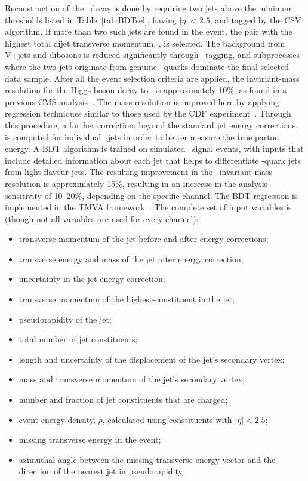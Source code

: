 \documentclass[12pt,twoside,a4paper,cmspaper,final,collab]{cms-tdr}
\begin{document}
Reconstruction of the \HBB\ decay is done by requiring two
jets above the minimum \pt thresholds listed in Table~\ref{tab:BDTsel}, having $|\eta|<2.5$, and tagged by the
CSV algorithm.
If more than two such jets are
found in the event, the pair with the
highest total dijet transverse momentum, \ptjj, is selected. The background from V+jets and
dibosons is reduced significantly
through \cPqb\ tagging, and subprocesses where the two jets originate from
genuine \cPqb\ quarks dominate the final selected data sample. After all
the event selection criteria are applied, the invariant-mass
resolution for the Higgs boson decay to \cPqb\cPqb\ is
approximately 10\%, as found in a previous CMS analysis~\cite{VHbb_PLB}. The mass resolution
is improved here by applying regression techniques similar to those used by
the CDF experiment~\cite{1107.3026}. Through this procedure, a further correction, beyond the
standard jet energy corrections, is computed for
individual \cPqb\ jets in order to better measure the true parton
energy. A BDT algorithm is trained on
simulated  \HBB\ signal events, with
inputs that include detailed information about each jet
that helps to differentiate \cPqb-quark jets from light-flavour jets.
The resulting improvement in the \cPqb\cPqb\ invariant-mass resolution is approximately
15\%, resulting in an increase in the analysis sensitivity of
10--20\%, depending on the specific channel. The BDT regression is
implemented in the TMVA framework~\cite{Hocker:2007ht}.
The complete set of input variables is
(though not all variables are used for every channel):
\begin{itemize}
 \item transverse momentum of the jet before  and after energy corrections;
\item  transverse energy and mass of the jet after energy
  correction;
 \item  uncertainty in the jet energy correction;
 \item transverse momentum of the highest-\PT constituent in the jet;
\item pseudorapidity of the jet;
\item total number of jet constituents;
 \item length and uncertainty  of the displacement of the jet's secondary vertex;
\item mass and transverse momentum of the jet's secondary vertex;
\item number and fraction of jet constituents that are charged;
 \item event energy density, $\rho$, calculated using constituents with $\left | \eta \right | < 2.5$;
\item missing transverse energy in the event;
 \item  azimuthal angle between the missing transverse
   energy vector and the direction of the nearest jet in pseudorapidity.
\end{itemize}
\end{document}
